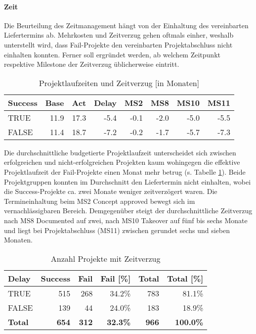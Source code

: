 \paragraph{Zeit} Die Beurteilung des Zeitmanagement hängt von der Einhaltung des vereinbarten Liefertermins ab. Mehrkosten und Zeitverzug gehen oftmals einher, weshalb unterstellt wird, dass Fail-Projekte den vereinbarten Projektabschluss nicht einhalten konnten. Ferner soll ergründet werden, ab welchem Zeitpunkt respektive Milestone der Zeitverzug üblicherweise eintritt.
\begin{table}[H]
	\centering
	\caption{Projektlaufzeiten und Zeitverzug [in Monaten]}
	\begin{tabular}{lrrrrrrr}
		\textbf{Success} & \multicolumn{1}{l}{\textbf{Base}} & \multicolumn{1}{l}{\textbf{Act}} & \multicolumn{1}{l}{\textbf{Delay}} & \multicolumn{1}{l}{\textbf{MS2}} & \multicolumn{1}{l}{\textbf{MS8}} & \multicolumn{1}{l}{\textbf{MS10}} & \multicolumn{1}{l}{\textbf{MS11}} \\ \hline
		TRUE  & 11.9  & 17.3  & -5.4  & -0.1  & -2.0  & -5.0  & -5.5 \\
		FALSE & 11.4  & 18.7  & -7.2  & -0.2  & -1.7  & -5.7  & -7.3 \\
	\end{tabular}%
	\label{mtime}%
\end{table}%
Die durchschnittliche budgetierte Projektlaufzeit unterscheidet sich zwischen erfolgreichen und  nicht-erfolgreichen Projekten kaum wohingegen die effektive Projektlaufzeit der Fail-Projekte einen Monat mehr betrug (s. Tabelle \ref{mtime}). Beide Projektgruppen konnten im Durchschnitt den Liefertermin nicht einhalten, wobei die Success-Projekte ca. zwei Monate weniger zeitverzögert waren. Die Termineinhaltung beim MS2 Concept approved bewegt sich im vernachlässigbaren Bereich. Demgegenüber steigt der durchschnittliche Zeitverzug nach MS8 Documented auf zwei, nach MS10 Takeover auf fünf bis sechs Monate und liegt bei Projektabschluss (MS11) zwischen gerundet sechs und sieben Monaten.
\begin{table}[H]
	\centering
	\caption{Anzahl Projekte mit Zeitverzug}
	\begin{tabular}{lrrrrr}
		\textbf{Delay} & \multicolumn{1}{l}{\textbf{Success}} & \multicolumn{1}{l}{\textbf{Fail}} & \multicolumn{1}{l}{\textbf{Fail [\%]}} & \multicolumn{1}{l}{\textbf{Total}} & \multicolumn{1}{l}{\textbf{Total [\%]}} \\ \hline
		TRUE  & 515   & 268   & 34.2\% & 783   & 81.1\% \\
		FALSE & 139   & 44    & 24.0\% & 183   & 18.9\% \\\hline
		\textbf{Total} & \textbf{654} & \textbf{312} & \textbf{32.3\%} & \textbf{966} & \textbf{100.0\%} \\
	\end{tabular}%
	\label{fdelay}%
\end{table}%
